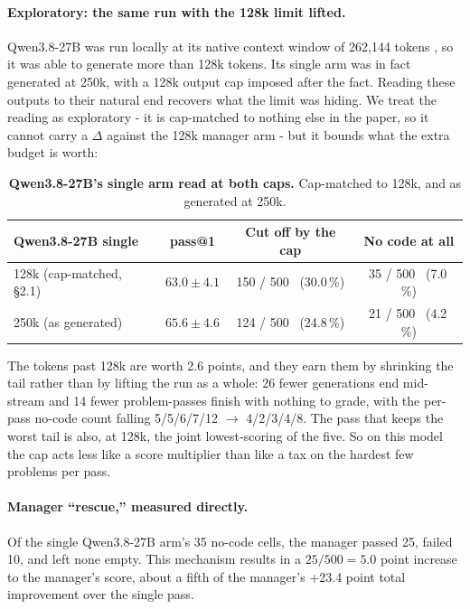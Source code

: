 \documentclass[11pt]{article}
\begin{document}
\paragraph{Exploratory: the same run with the 128k limit lifted.}
Qwen3.8-27B was run locally at its native context window of 262{,}144 tokens \cite{qwen2026c}, so it was able to generate more than 128k tokens. Its single arm was in fact generated at 250k, with a 128k output cap imposed after the fact. Reading these outputs to their natural end recovers what the limit was hiding. We treat the reading as
exploratory - it is cap-matched to nothing else in the paper, so it cannot carry a
$\Delta$ against the 128k manager arm - but it bounds what the extra budget is worth:

\begin{table}[htbp]
\centering
\caption{\textbf{Qwen3.8-27B's single arm read at both caps.} Cap-matched to 128k, and as
generated at 250k.}
\small
\begin{tabular}{@{}lccc@{}}
\toprule
\textbf{Qwen3.8-27B single} & \textbf{pass@1} & \textbf{Cut off by the cap} &
\textbf{No code at all} \\
\midrule
128k (cap-matched, \S2.1)       & $63.0 \pm 4.1$ & 150 / 500 \ (30.0\,\%) & 35 / 500 \ (7.0\,\%) \\
250k (as generated)             & $65.6 \pm 4.6$ & 124 / 500 \ (24.8\,\%) & 21 / 500 \ (4.2\,\%) \\
\bottomrule
\end{tabular}
\end{table}

The tokens past 128k are worth 2.6 points, and they earn them by shrinking the
tail rather than by lifting the run as a whole: 26 fewer generations end mid-stream and 14
fewer problem-passes finish with nothing to grade, with the per-pass no-code count falling
5/5/6/7/12 $\to$ 4/2/3/4/8. The pass that keeps the worst tail is also, at 128k, the joint
lowest-scoring of the five. So on this model the cap acts less like a score multiplier than like a tax on
the hardest few problems per pass.

\paragraph{Manager ``rescue,'' measured directly.}
Of the single Qwen3.8-27B arm's 35 no-code cells, the manager passed 25, failed 10, and left
none empty. This mechanism results in a $25/500=5.0$ point increase to the manager's score, about a fifth of the manager's +23.4 point total improvement over the single pass.
\end{document}
